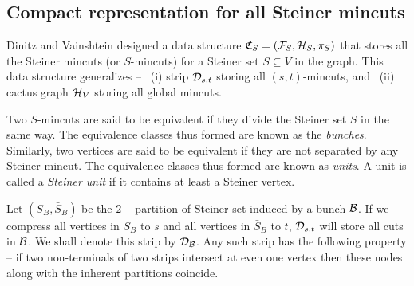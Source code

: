 \subsection{Compact representation for all Steiner mincuts} \label{subsec:connectivity-carcass}

Dinitz and Vainshtein \cite{DBLP:conf/stoc/DinitzV94} designed a data structure $\mathfrak{C}_S = ({\cal F}_S,{\cal H}_S, \pi_S)$ that stores all the Steiner mincuts (or $S$-mincuts) for a Steiner set $S\subseteq V$ in the graph. 
This data structure generalizes --
~(i) strip ${\cal D}_{s,t}$ storing all $(s,t)$-mincuts, and
~(ii) cactus graph ${\cal H}_V$ storing all global mincuts.

Two $S$-mincuts are said to be equivalent if they divide the Steiner set $S$ in the same way. The equivalence classes thus formed are known as the \textit{bunches}. Similarly, two vertices are said to be equivalent if they are not separated by any Steiner mincut. The equivalence classes thus formed are known as \textit{units}. A unit is called a \textit{Steiner unit} if it contains at least a Steiner vertex.

Let $(S_B,{\bar S_B})$ be the $2-$partition of Steiner set induced by a bunch $\cal B$. If we compress all vertices in $S_B$ to $s$ and all vertices in ${\bar S_B}$ to $t$, ${\cal D}_{s,t}$ will store all cuts in ${\cal B}$. We shall denote this strip by ${\cal D}_{\cal B}$. Any such strip has the following property -- if two non-terminals of two strips intersect at even one vertex then these nodes along with the inherent partitions coincide.

